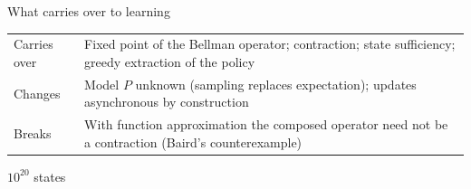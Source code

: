 \begin{frame}{What carries over to learning}
	\begin{tabularx}{\textwidth}{@{}lX@{}}
		\toprule
		Carries over & Fixed point of the Bellman operator; contraction; state sufficiency; greedy extraction of the policy\\
		Changes & Model $P$ unknown (sampling replaces expectation); updates asynchronous by construction\\
		Breaks & With function approximation the composed operator need not be a contraction (Baird's counterexample)\\
		\bottomrule
	\end{tabularx}
\end{frame}

\begin{frame}{$10^{20}$ states}
\end{frame}
